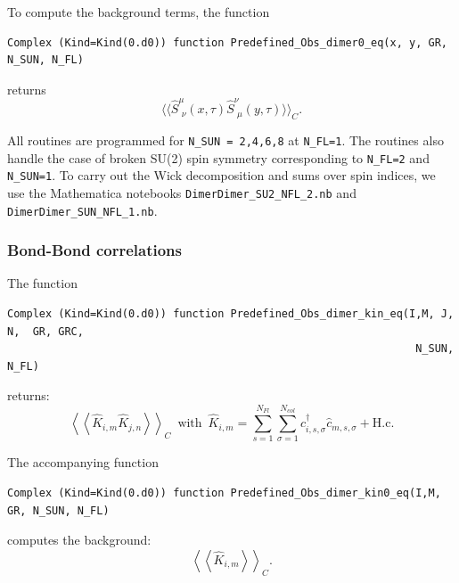 To compute the background terms, the function
\begin{lstlisting}[style=fortran]
Complex (Kind=Kind(0.d0)) function Predefined_Obs_dimer0_eq(x, y, GR, N_SUN, N_FL)
\end{lstlisting}
returns 
\begin{equation}
\langle \langle \hat{S}^{\mu}_{\, \,  \nu} (x,\tau)   \hat{S}^{\nu}_{\, \,  \mu} (y,\tau)  \rangle   \rangle_C .
\end{equation} 

All routines  are programmed  for \texttt{N\_SUN = 2,4,6,8} at \texttt{N\_FL=1}.   The routines also handle the case of broken SU(2)  spin symmetry corresponding  to  \texttt{N\_FL=2}  and \texttt{N\_SUN=1}.   To carry out the Wick decomposition  and sums over  spin indices,  we use the  Mathematica  notebooks 
\texttt{Dimer\-Dimer\_SU2\_NFL\_2.nb}  and \texttt{Dimer\-Dimer\_SUN\_NFL\_1.nb}.

\subsubsection{Bond-Bond  correlations}
The  function 
\begin{lstlisting}[style=fortran]
 Complex (Kind=Kind(0.d0)) function Predefined_Obs_dimer_kin_eq(I,M, J, N,  GR, GRC, 
                                                                N_SUN, N_FL) 
\end{lstlisting}
returns:
\begin{equation}  
  \left< \left< \hat{K}_{i,m}  \hat{K}_{j,n}    \right>  \right>_C    \, \, \,   \text{with} \, \, \,  \hat{K}_{i,m}   = 
  \sum_{s=1}^{N_{Fl}} \sum_{\sigma=1}^{N_{col}}  \hat{c}^{\dagger}_{i,s,\sigma}  \hat{c}^{\phantom\dagger}_{m,s, \sigma}   + \text{H.c.} 
\end{equation}

\noindent
The  accompanying  function 
\begin{lstlisting}[style=fortran]
Complex (Kind=Kind(0.d0)) function Predefined_Obs_dimer_kin0_eq(I,M, GR, N_SUN, N_FL) 
 \end{lstlisting} 
computes  the  background:
\begin{equation}
	 \left< \left< \hat{K}_{i,m}    \right>  \right>_C.
\end{equation}


